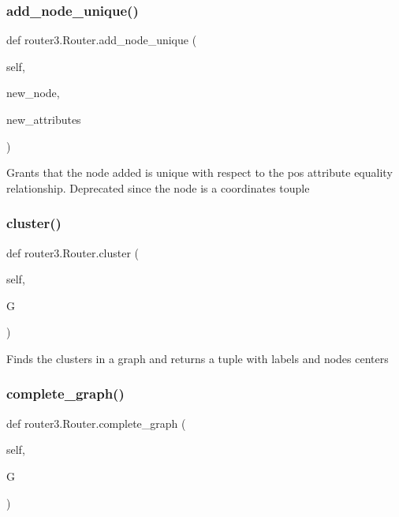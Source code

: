 \subsubsection{add\+\_\+node\+\_\+unique()}
{\footnotesize\ttfamily def router3.\+Router.\+add\+\_\+node\+\_\+unique (\begin{DoxyParamCaption}\item[{}]{self,  }\item[{}]{new\+\_\+node,  }\item[{}]{new\+\_\+attributes }\end{DoxyParamCaption})}

\begin{DoxyVerb}Grants that the node added is unique with respect to the pos
attribute equality relationship.
Deprecated since the node is a coordinates touple
\end{DoxyVerb}
 \mbox{\label{classrouter3_1_1_router_aa4e0d0dcd580c0ac9d04a7a7c21eb4ad}} 
\subsubsection{cluster()}
{\footnotesize\ttfamily def router3.\+Router.\+cluster (\begin{DoxyParamCaption}\item[{}]{self,  }\item[{}]{G }\end{DoxyParamCaption})}

\begin{DoxyVerb}Finds the clusters in a graph and returns a tuple with labels and nodes centers
\end{DoxyVerb}
 \mbox{\label{classrouter3_1_1_router_a9da692cd46b118ca01f0591472470c05}} 
\subsubsection{complete\+\_\+graph()}
{\footnotesize\ttfamily def router3.\+Router.\+complete\+\_\+graph (\begin{DoxyParamCaption}\item[{}]{self,  }\item[{}]{G }\end{DoxyParamCaption})}

